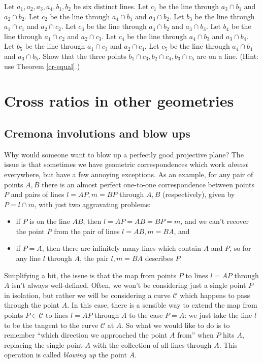\begin{exer} Let $a_1,a_2,a_3,a_4,b_1,b_2$ be six distinct lines. Let $c_1$ be the line through $a_3\cap b_1$ and $a_2\cap b_2$. Let $c_2$ be the line through $a_4\cap b_1$ and $a_3\cap b_2$. Let $b_3$ be the line through $a_1\cap c_1$ and $a_2\cap c_2$. Let $c_3$ be the line through $a_4\cap b_2$ and $a_3\cap b_3$. Let $b_4$ be the line through $a_1\cap c_2$ and $a_2\cap c_3$. Let $c_4$ be the line through $a_4\cap b_3$ and $a_3\cap b_4$. Let $b_5$ be the line through $a_1\cap c_3$ and $a_2\cap c_4$. Let $c_5$ be the line through $a_4\cap b_4$ and $a_3\cap b_5$. Show that the three points $b_1\cap c_3, b_2\cap c_4, b_3\cap c_5$ are on a line. (Hint: use Theorem \ref{cr-equal}.)
\end{exer}


\bigskip

\section{Cross ratios in other geometries}

\subsection{Cremona involutions and blow ups}

Why would someone want to blow up a perfectly good projective plane? The issue is that sometimes we have geometric correspondences which work \emph{almost} everywhere, but have a few annoying exceptions. As an example, for any pair of points $A,B$ there is an almost perfect one-to-one correspondence between points $P$ and pairs of lines $l = AP, m = BP$ through $A,B$ (respectively), given by $P = l \cap m$, with just two aggravating problems:
\begin{itemize}
\item if $P$ is on the line $AB$, then $l = AP = AB = BP = m$, and we can't recover the point $P$ from the pair of lines $l=AB, m=BA$, and
\item if $P = A$, then there are infinitely many lines which contain $A$ and $P$, so for any line $l$ through $A$, the pair $l, m=BA$ describes $P$.
\end{itemize}

Simplifying a bit, the issue is that the map from points $P$ to lines $l = AP$ through $A$ isn't always well-defined. Often, we won't be considering just a single point $P$ in isolation, but rather we will be considering a curve $\mathcal{C}$ which happens to pass through the point $A$. In this case, there is a sensible way to extend the map from points $P \in \mathcal{C}$ to lines $l = AP$ through $A$ to the case $P = A$: we just take the line $l$ to be the tangent to the curve $\mathcal{C}$ at $A$. So what we would like to do is to remember ``which direction we approached the point $A$ from'' when $P$ hits $A$, replacing the single point $A$ with the collection of all lines through $A$. This operation is called \emph{blowing up} the point $A$.

